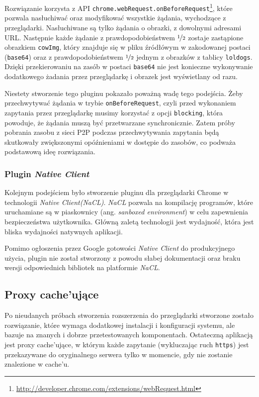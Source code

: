 \documentclass[a4paper,11pt]{scrartcl}
\newcommand{\f}{\texttt}
\newcommand{\keszu}{cache'u}
\newcommand{\keszujace}{cache'ujące}
\begin{document}
Rozwiązanie korzysta z API \f{chrome.webRequest.onBeforeRequest}\footnote{\url{http://developer.chrome.com/extensions/webRequest.html}}, które pozwala nasłuchiwać oraz modyfikować wszystkie żądania, wychodzące z przeglądarki. Nasłuchiwane są tylko żądania o obrazki, z dowolnymi adresami URL. Następnie każde żądanie z prawdopodobieństwem $\nicefrac{1}{2}$ zostaje zastąpione obrazkiem \f{cowImg}, który znajduje się w pliku źródłówym w zakodowanej postaci (\f{base64}) oraz z prawdopodobieństwem $\nicefrac{1}{2}$ jednym z obrazków z tablicy \f{loldogs}. Dzięki przekierowaniu na zasób w postaci \f{base64} nie jest konieczne wykonywanie dodatkowego żadania przez przeglądarkę i obrazek jest wyświetlany od razu. 

Niestety stworzenie tego pluginu pokazało poważną wadę tego podejścia. Żeby przechwytywać żądania w trybie \f{onBeforeRequest}, czyli przed wykonaniem zapytania przez przeglądarkę musimy korzystać z opcji \f{blocking}, która powoduje, że żądania muszą być przetwarzane synchronicznie. Zatem próby pobrania zasobu z sieci P2P podczas przechwytywania zapytania będą skutkowały zwiększonymi opóźnieniami w dostępie do zasobów, co podważa podstawową ideę rozwiązania.

\subsubsection{Plugin \textit{Native Client}}
\label{sect_plugin_2}
Kolejnym podejściem było stworzenie pluginu dla przeglądarki Chrome w technologii \textit{Native Client(NaCL)}. \textit{NaCL} pozwala na kompilację programów, które uruchamiane są w piaskownicy (ang. \textit{sanboxed environment}) w celu zapewnienia bezpieczeństwa użytkownika. Główną zaletą technologii jest wydajność, która jest bliska wydajności natywnych aplikacji.

Pomimo ogłoszenia przez Google gotowości \textit{Native Client} do produkcyjnego użycia, plugin nie został stworzony z powodu słabej dokumentacji oraz braku wersji odpowiednich bibliotek na platformie \textit{NaCL}.

\subsection{Proxy \keszujace}
\label{sect_impl_proxy}
Po nieudanych próbach stworzenia rozszerzenia do przeglądarki stworzone zostało rozwiązanie, które wymaga dodatkowej instalacji i konfiguracji systemu, ale bazuje na znanych i dobrze przetestowanych komponentach. Ostateczną aplikacją jest proxy \keszujace, w którym każde zapytanie (wykluczając ruch \f{https}) jest przekazywane do oryginalnego serwera tylko w momencie, gdy nie zostanie znalezione w \keszu.
\end{document}
